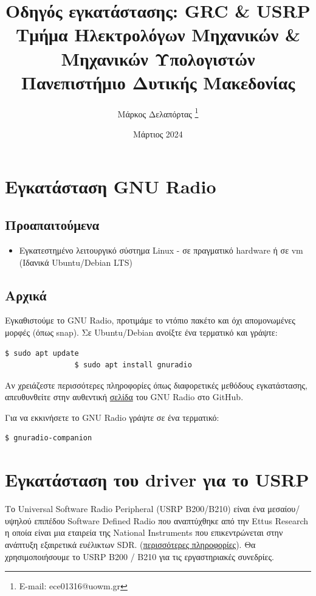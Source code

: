 \documentclass[12pt]{report}
\title{\textsf{Οδηγός εγκατάστασης: GRC \& USRP\\
    \large Τμήμα Ηλεκτρολόγων Μηχανικών \& Μηχανικών Υπολογιστών \\
    Πανεπιστήμιο Δυτικής Μακεδονίας
}}
\author{\textsf{Μάρκος Δελαπόρτας} \footnote{E-mail: ece01316@uowm.gr}}
\date{\textsf{Mάρτιος 2024}}
\begin{document}
    \maketitle

    \section*{\textsf{Εγκατάσταση GNU Radio}}
        \subsection*{\textsf{Προαπαιτούμενα}}
        \begin{itemize}
            \item Εγκατεστημένο λειτουργικό σύστημα Linux - σε πραγματικό hardware ή σε vm
            (Ιδανικά Ubuntu/Debian LTS)
        \end{itemize}

        \subsection*{\textsf{Αρχικά}}
            Εγκαθιστούμε το GNU Radio, προτιμάμε το ντόπιο πακέτο και όχι απομονωμένες μορφές (όπως snap).
            Σε Ubuntu/Debian ανοίξτε ένα τερματικό και γράψτε:
            \begin{lstlisting}[language=bash]
                $ sudo apt update
                $ sudo apt install gnuradio
            \end{lstlisting}

            Αν χρειάζεστε περισσότερες πληροφορίες όπως διαφορετικές μεθόδους εγκατάστασης, απευθυνθείτε
            στην αυθεντική \href{ https://github.com/gnuradio/gnuradio}{σελίδα} του GNU Radio στο GitHub.

            Για να εκκινήσετε το GNU Radio γράψτε σε ένα τερματικό:
            \begin{lstlisting}[language=bash]
                $ gnuradio-companion
            \end{lstlisting}

    \section*{\textsf{Εγκατάσταση του driver για το USRP}}

        Το Universal Software Radio Peripheral (USRP B200/B210) είναι ένα μεσαίου/υψηλού επιπέδου 
        Software Defined Radio που αναπτύχθηκε από την Ettus Research η οποία είναι μια εταιρεία της
        National Instruments που επικεντρώνεται στην ανάπτυξη εξαιρετικά ευέλικτων SDR.
        (\href{https://www.ettus.com/products/}{περισσότερες πληροφορίες}). 
        Θα χρησιμοποιήσουμε το USRP B200 / B210 για τις εργαστηριακές συνεδρίες.
\end{document}
